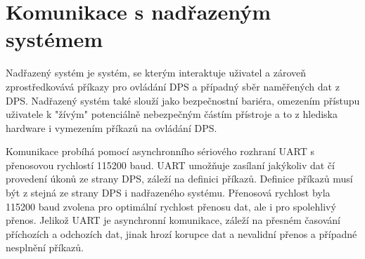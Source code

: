 \section{Komunikace s nadřazeným systémem}
Nadřazený systém je systém, se kterým interaktuje uživatel a zároveň zprostředkovává příkazy pro ovládání DPS a případný sběr naměřených dat z DPS.
Nadřazený systém také slouží jako bezpečnostní bariéra, omezením přístupu uživatele k "žívým" potenciálně nebezpečným částím přístroje a to z hlediska hardware i vymezením příkazů na ovládání DPS.
\par
Komunikace probíhá pomocí asynchronního sériového rozhraní UART s přenosovou rychlostí 115200 baud.
UART umožňuje zasílaní jakýkoliv dat čí provedení úkonů ze strany DPS, záleží na definici příkazů. Definice příkazů musí být z stejná ze strany DPS i nadřazeného systému.
Přenosová rychlost byla 115200 baud zvolena pro optimální rychlost přenosu dat, ale i pro spolehlivý přenos.
Jelikož UART je asynchronní komunikace, záleží na přesném časování příchozích a odchozích dat,
jinak hrozí korupce dat a nevalidní přenos a případné nesplnění příkazů.